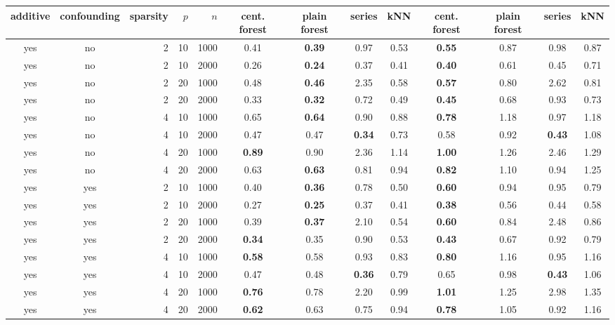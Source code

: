 \begin{table}[ht]
\centering
\begin{tabular}{||cc|rrr||cccc|cccc||}
  \hline
\hline
additive & confounding & sparsity & $p$ & $n$ & cent. forest & plain forest & series & kNN & cent. forest & plain forest & series & kNN \\ 
  \hline
\hline
yes & no & 2 & 10 & 1000 & 0.41 & \bf 0.39 & 0.97 & 0.53 & \bf 0.55 & 0.87 & 0.98 & 0.87 \\ 
  yes & no & 2 & 10 & 2000 & 0.26 & \bf 0.24 & 0.37 & 0.41 & \bf 0.40 & 0.61 & 0.45 & 0.71 \\ 
  yes & no & 2 & 20 & 1000 & 0.48 & \bf 0.46 & 2.35 & 0.58 & \bf 0.57 & 0.80 & 2.62 & 0.81 \\ 
  yes & no & 2 & 20 & 2000 & 0.33 & \bf 0.32 & 0.72 & 0.49 & \bf 0.45 & 0.68 & 0.93 & 0.73 \\ 
   \hline
yes & no & 4 & 10 & 1000 & 0.65 & \bf 0.64 & 0.90 & 0.88 & \bf 0.78 & 1.18 & 0.97 & 1.18 \\ 
  yes & no & 4 & 10 & 2000 & 0.47 & 0.47 & \bf 0.34 & 0.73 & 0.58 & 0.92 & \bf 0.43 & 1.08 \\ 
  yes & no & 4 & 20 & 1000 & \bf 0.89 & 0.90 & 2.36 & 1.14 & \bf 1.00 & 1.26 & 2.46 & 1.29 \\ 
  yes & no & 4 & 20 & 2000 & 0.63 & \bf 0.63 & 0.81 & 0.94 & \bf 0.82 & 1.10 & 0.94 & 1.25 \\ 
   \hline
yes & yes & 2 & 10 & 1000 & 0.40 & \bf 0.36 & 0.78 & 0.50 & \bf 0.60 & 0.94 & 0.95 & 0.79 \\ 
  yes & yes & 2 & 10 & 2000 & 0.27 & \bf 0.25 & 0.37 & 0.41 & \bf 0.38 & 0.56 & 0.44 & 0.58 \\ 
  yes & yes & 2 & 20 & 1000 & 0.39 & \bf 0.37 & 2.10 & 0.54 & \bf 0.60 & 0.84 & 2.48 & 0.86 \\ 
  yes & yes & 2 & 20 & 2000 & \bf 0.34 & 0.35 & 0.90 & 0.53 & \bf 0.43 & 0.67 & 0.92 & 0.79 \\ 
   \hline
yes & yes & 4 & 10 & 1000 & \bf 0.58 & 0.58 & 0.93 & 0.83 & \bf 0.80 & 1.16 & 0.95 & 1.16 \\ 
  yes & yes & 4 & 10 & 2000 & 0.47 & 0.48 & \bf 0.36 & 0.79 & 0.65 & 0.98 & \bf 0.43 & 1.06 \\ 
  yes & yes & 4 & 20 & 1000 & \bf 0.76 & 0.78 & 2.20 & 0.99 & \bf 1.01 & 1.25 & 2.98 & 1.35 \\ 
  yes & yes & 4 & 20 & 2000 & \bf 0.62 & 0.63 & 0.75 & 0.94 & \bf 0.78 & 1.05 & 0.92 & 1.16 \\ 

\end{tabular}
\end{table}
